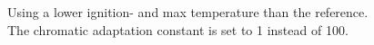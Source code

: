 \begin{figure}[h!]
\centering
{}
\caption
{
\label{fig:fire7}
Using a lower ignition- and max temperature than the reference. The chromatic adaptation constant is set to 1 instead of 100.
}
\end{figure} 

